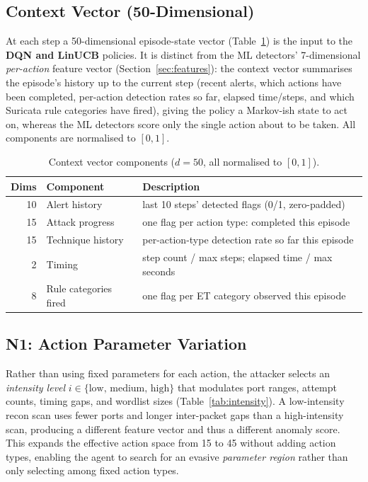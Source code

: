 \documentclass[sigconf]{acmart}
\begin{document}
\subsection{Context Vector (50-Dimensional)}
\label{sec:context}

At each step a 50-dimensional episode-state vector (Table~\ref{tab:context})
is the input to the \textbf{DQN and LinUCB} policies. It is distinct
from the ML detectors' 7-dimensional \emph{per-action} feature vector
(Section~\ref{sec:features}): the context vector summarises the
episode's history up to the current step (recent alerts, which actions
have been completed, per-action detection rates so far, elapsed
time/steps, and which Suricata rule categories have fired), giving the
policy a Markov-ish state to act on, whereas the ML detectors score only
the single action about to be taken. All components are normalised to
$[0,1]$.

\begin{table}[t]
\caption{Context vector components ($d = 50$, all normalised to $[0,1]$).}
\label{tab:context}
\centering
\small
\begin{tabular}{r l l}
\toprule
Dims & Component & Description \\
\midrule
10 & Alert history & last 10 steps' detected flags (0/1, zero-padded) \\
15 & Attack progress & one flag per action type: completed this episode \\
15 & Technique history & per-action-type detection rate so far this episode \\
2  & Timing & step count / max steps; elapsed time / max seconds \\
8  & Rule categories fired & one flag per ET category observed this episode \\
\bottomrule
\end{tabular}
\end{table}

\subsection{N1: Action Parameter Variation}
\label{sec:n1}

Rather than using fixed parameters for each action, the attacker selects
an \emph{intensity level} $i \in \{\text{low, medium, high}\}$ that
modulates port ranges, attempt counts, timing gaps, and wordlist sizes
(Table~\ref{tab:intensity}). A low-intensity recon scan uses fewer ports
and longer inter-packet gaps than a high-intensity scan, producing a
different feature vector and thus a different anomaly score. This
expands the effective action space from 15 to 45 without adding action
types, enabling the agent to search for an evasive \emph{parameter
region} rather than only selecting among fixed action types.
\end{document}
